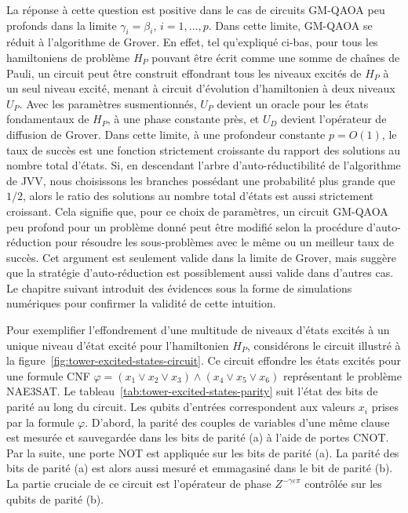 La réponse à cette question est positive dans le cas de circuits GM-QAOA peu profonds dans la limite $\gamma_{i}=\beta_{i}$, $i=1,\dots,p$. Dans cette limite, GM-QAOA se réduit à l'algorithme de Grover. En effet, tel qu'expliqué ci-bas, pour tous les hamiltoniens de problème $H_{P}$ pouvant être écrit comme une somme de chaînes de Pauli, un circuit peut être construit effondrant tous les niveaux excités de $H_{P}$ à un seul niveau excité, menant à circuit d'évolution d'hamiltonien à deux niveaux $U_{P}$. Avec les paramètres susmentionnés, $U_{P}$ devient un oracle pour les états fondamentaux de $H_{P}$, à une phase constante près, et $U_{D}$ devient l'opérateur de diffusion de Grover. Dans cette limite, à une profondeur constante $p=O(1)$, le taux de succès est une fonction strictement croissante du rapport des solutions au nombre total d'états. Si, en descendant l'arbre d'auto-réductibilité de l'algorithme de JVV, nous choisissons les branches possédant une probabilité plus grande que $1/2$, alors le ratio des solutions au nombre total d'états est aussi strictement croissant. Cela signifie que, pour ce choix de paramètres, un circuit GM-QAOA peu profond pour un problème donné peut être modifié selon la procédure d'auto-réduction pour résoudre les sous-problèmes avec le même ou un meilleur taux de succès. Cet argument est seulement valide dans la limite de Grover, mais suggère que la stratégie d'auto-réduction est possiblement aussi valide dans d'autres cas. Le chapitre suivant introduit des évidences sous la forme de simulations numériques pour confirmer la validité de cette intuition.

Pour exemplifier l'effondrement d'une multitude de niveaux d'états excités à un unique niveau d'état excité pour l'hamiltonien $H_{P}$, considérons le circuit illustré à la figure~\ref{fig:tower-excited-states-circuit}. Ce circuit effondre les états excités pour une formule CNF $\varphi = (x_{1} \lor x_{2} \lor x_{3}) \land (x_{4} \lor x_{5} \lor x_{6})$ représentant le problème NAE3SAT. Le tableau~\ref{tab:tower-excited-states-parity} suit l'état des bits de parité au long du circuit. Les qubits d'entrées correspondent aux valeurs $x_{i}$ prises par la formule $\varphi$. D'abord, la parité des couples de variables d'une même clause est mesurée et sauvegardée dans les bits de parité (a) à l'aide de portes CNOT. Par la suite, une porte NOT est appliquée sur les bits de parité (a). La parité des bits de parité (a) est alors aussi mesuré et emmagasiné dans le bit de parité (b). La partie cruciale de ce circuit est l'opérateur de phase $Z^{-\gamma \varepsilon \pi}$ contrôlée sur les qubits de parité (b).

